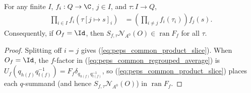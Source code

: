 \begin{lemma}%
    \label{thm:peps_four_cut_common_uncut_support}
    \leanok
    For any finite $I$, $f_i:Q\to\C$, $j\in I$, and $\tau:I\to Q$,
    \begin{align}
        \prod_{i\in I}f_i(\tau[j\mapsto s]_i)
         & =\left(\prod_{i\ne j}f_i(\tau_i)\right)f_j(s).
        \label{eq:peps_common_product_slice}
    \end{align}
    Consequently, if $O_f=\Id$, then $S_{f,\tau}\mathcal N_{A^0}(O)\in\operatorname{ran}F_f$ for all $\tau$.
\end{lemma}
\begin{proof}\leanok
    Splitting off $i=j$ gives (\ref{eq:peps_common_product_slice}). When $O_f=\Id$, the $f$-factor in (\ref{eq:peps_common_regrouped_average}) is $U_f(q_{h(f)}q_{t(f)}^{-1})=F_f\delta_{q_{h(f)}q_{t(f)}^{-1}}$, so (\ref{eq:peps_common_product_slice}) places each $q$-summand (and hence $S_{f,\tau}\mathcal N_{A^0}(O)$) in $\operatorname{ran}F_f$.
\end{proof}


